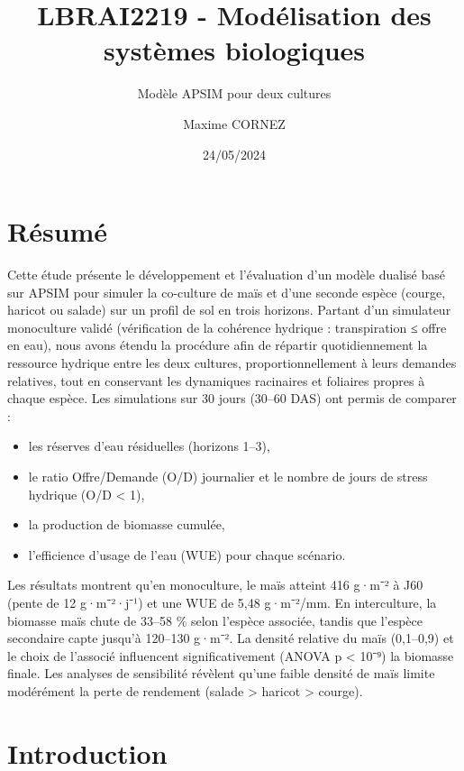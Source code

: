 \documentclass[
]{article}
\title{LBRAI2219 - Modélisation des systèmes biologiques}
\subtitle{Modèle APSIM pour deux cultures}
\author{Maxime CORNEZ}
\date{24/05/2024}
\begin{document}
\maketitle

{
\setcounter{tocdepth}{2}
\tableofcontents
}
\newpage

\section{Résumé}\label{ruxe9sumuxe9}

Cette étude présente le développement et l'évaluation d'un modèle
dualisé basé sur APSIM pour simuler la co-culture de maïs et d'une
seconde espèce (courge, haricot ou salade) sur un profil de sol en trois
horizons. Partant d'un simulateur monoculture validé (vérification de la
cohérence hydrique : transpiration ≤ offre en eau), nous avons étendu la
procédure afin de répartir quotidiennement la ressource hydrique entre
les deux cultures, proportionnellement à leurs demandes relatives, tout
en conservant les dynamiques racinaires et foliaires propres à chaque
espèce. Les simulations sur 30 jours (30--60 DAS) ont permis de comparer
:

\begin{itemize}
\item
  les réserves d'eau résiduelles (horizons 1--3),
\item
  le ratio Offre/Demande (O/D) journalier et le nombre de jours de
  stress hydrique (O/D \textless{} 1),
\item
  la production de biomasse cumulée,
\item
  l'efficience d'usage de l'eau (WUE) pour chaque scénario.
\end{itemize}

Les résultats montrent qu'en monoculture, le maïs atteint 416 g·m⁻² à
J60 (pente de 12 g·m⁻²·j⁻¹) et une WUE de 5,48 g·m⁻²/mm. En
interculture, la biomasse maïs chute de 33--58 \% selon l'espèce
associée, tandis que l'espèce secondaire capte jusqu'à 120--130 g·m⁻².
La densité relative du maïs (0,1--0,9) et le choix de l'associé
influencent significativement (ANOVA p \textless{} 10⁻⁹) la biomasse
finale. Les analyses de sensibilité révèlent qu'une faible densité de
maïs limite modérément la perte de rendement (salade \textgreater{}
haricot \textgreater{} courge).

\newpage

\section{Introduction}\label{introduction}
\end{document}
